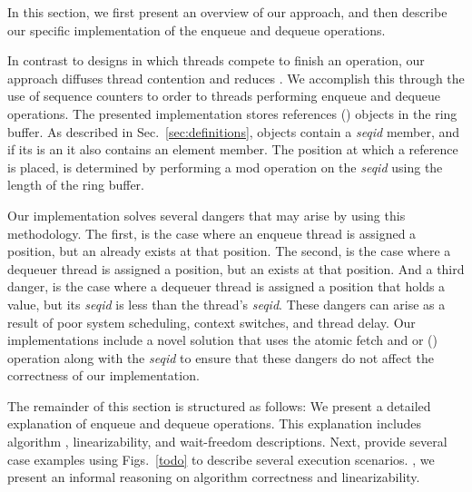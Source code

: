 



In this section, we first present an overview of our approach, and then describe our specific implementation of the enqueue and dequeue operations.

In contrast to designs in which threads compete to finish an operation, our approach diffuses thread contention and reduces .
We accomplish this through the use of sequence counters to  order to threads performing enqueue and dequeue operations.
The presented implementation stores references  ()  objects in the ring buffer.
As described in Sec.~\ref{sec:definitions},  objects contain a \emph{seqid} member, and if its is an  it also contains an element member.
The position at which a  reference is placed, is determined by performing a mod operation on the \emph{seqid} using the length of the ring buffer.

Our implementation solves several dangers that may arise by using this methodology.
The first, is the case where an enqueue thread is assigned a position, but an  already exists at that position.
The second, is the case where a dequeuer thread is assigned a position, but an   exists at that position.
And a third danger, is the case where a dequeuer thread is assigned a position that holds a value, but its \emph{seqid} is less than the thread's \emph{seqid}.
These dangers can arise as a result of poor system scheduling,  context switches, and thread delay. %
Our implementations include a novel solution that uses the atomic fetch and or () operation along with the \emph{seqid} to ensure that these dangers do not affect the correctness of our implementation.


The remainder of this section is structured as follows:
We present a detailed explanation of enqueue and dequeue operations.
This explanation includes algorithm , linearizability, and wait-freedom descriptions.
Next, provide several case examples using Figs.~\ref{todo} to describe several execution scenarios.
, we present an informal reasoning on algorithm correctness and linearizability.


